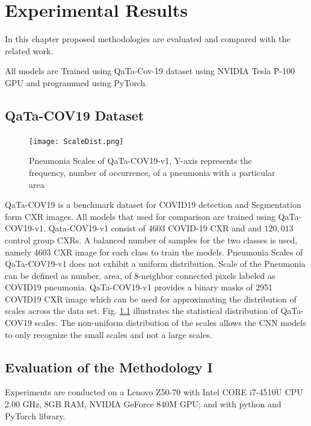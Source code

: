 
\chapter{Experimental Results} %

\label{chp:results} %
In this chapter proposed methodologies are evaluated and compared with the related work.

All models are Trained using QaTa-Cov-19 \cite{ahishali2021advance} dataset using NVIDIA Tesla P-100 GPU and programmed using PyTorch.
\section{QaTa-COV19 Dataset}
\begin{center}
    \begin{figure}[htbp]
    \centerline{\texttt{[image: ScaleDist.png]}}
    \caption{Pneumonia Scales of QaTa-COV19-v1, Y-axis represents the frequency, number of occurrence, of a pneumonia with a particular area}
    \label{pdist}
    \end{figure}
    \end{center}
QaTa-COV19 is a benchmark dataset for COVID19 detection and Segmentation form CXR images. All models that used for comparison are trained using QaTa-COV19-v1. Qata-COV19-v1 consist of  4603 COVID-19 CXR and  and $120,013$ control group CXRs. A balanced number of samples for the two classes is used, namely 4603 CXR image for each class to train the models. Pneumonia Scales of QaTa-COV19-v1 does not exhibit a uniform distribution. Scale of the Pneumonia can be defined as number, area, of 8-neighbor connected pixels labeled as COVID19 pneumonia. QaTa-COV19-v1 provides a binary masks of 2951 COVID19 CXR image which can be used for approximating the distribution of scales across the data set. Fig. \ref{pdist} illustrates the statistical distribution of QaTa-COV19 scales. The non-uniform distribution of the scales allows the CNN models to only recognize the small scales and not a large scales.

\section{Evaluation of the Methodology I}


Experiments are conducted on a Lenovo Z50-70 with Intel CORE i7-4510U CPU 2.00 GHz, 8GB RAM, NVIDIA GeForce 840M GPU; and with python and PyTorch library.

